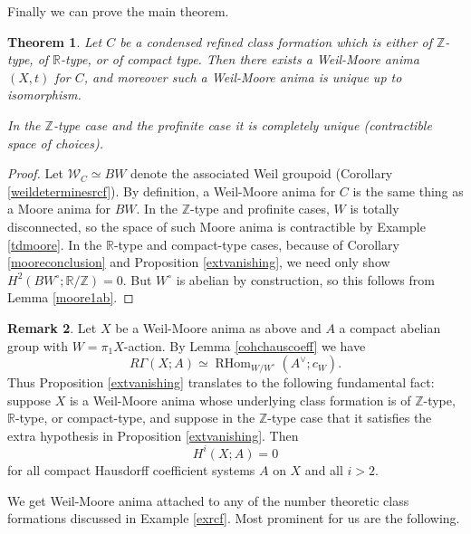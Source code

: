 \documentclass[12pt]{article}
\newtheorem{theorem}{Theorem}[section]
\theoremstyle{definition}
\newtheorem{remark}[theorem]{Remark}
\newcommand{\on}{\operatorname}
\newcommand{\mc}{\mathcal}
\newcommand{\mbb}{\mathbb}
\begin{document}
Finally we can prove the main theorem.

\begin{theorem}
Let $C$ be a condensed refined class formation which is either of $\mbb{Z}$-type, of $\mbb{R}$-type, or of compact type.  Then there exists a Weil-Moore anima $(X,t)$ for $C$, and moreover such a Weil-Moore anima is unique up to isomorphism.

In the $\mbb{Z}$-type case and the profinite case it is completely unique (contractible space of choices).
\end{theorem}
\begin{proof}
Let $\mc{W}_C\simeq BW$ denote the associated Weil groupoid (Corollary \ref{weildeterminesrcf}).  By definition, a Weil-Moore anima for $C$ is the same thing as a Moore anima for $BW$.  In the $\mbb{Z}$-type and profinite cases, $W$ is totally disconnected, so the space of such Moore anima is contractible by Example \ref{tdmoore}.  In the $\mbb{R}$-type and compact-type cases, because of Corollary \ref{mooreconclusion} and Proposition \ref{extvanishing}, we need only show $H^2(BW^\circ;\mbb{R}/\mbb{Z})=0$.  But $W^\circ$ is abelian by construction, so this follows from Lemma \ref{moore1ab}.
\end{proof}

\begin{remark}\label{vanishingchauscoh}
Let $X$ be a Weil-Moore anima as above and $A$ a compact abelian group with $W=\pi_1X$-action.  By Lemma \ref{cohchauscoeff} we have
$$R\Gamma(X;A) \simeq \on{RHom}_{W/W^\circ}(A^\vee;c_W).$$
Thus Proposition \ref{extvanishing} translates to the following fundamental fact: suppose $X$ is a Weil-Moore anima whose underlying class formation is of $\mbb{Z}$-type, $\mbb{R}$-type, or compact-type, and suppose in the $\mbb{Z}$-type case that it satisfies the extra hypothesis in Proposition \ref{extvanishing}.  Then 
$$H^i(X;A)=0$$
for all compact Hausdorff coefficient systems $A$ on $X$ and all $i>2$.
\end{remark}

We get Weil-Moore anima attached to any of the number theoretic class formations discussed in Example \ref{exrcf}.  Most prominent for us are the following.
\end{document}
